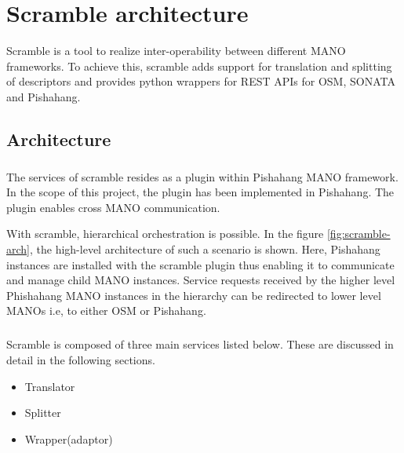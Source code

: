 \chapter{Scramble architecture}
\label{ch:Scramble architecture}

Scramble is a tool to realize inter-operability between different MANO frameworks. To achieve this, scramble adds support for translation and splitting of descriptors and provides python wrappers for REST APIs for OSM, SONATA and Pishahang.
\section{Architecture}
\paragraph{}
The services of scramble resides as a plugin within Pishahang MANO framework. In the scope of this project, the plugin has been implemented in Pishahang. The plugin enables cross MANO communication. 

With scramble, hierarchical orchestration is possible. In the figure \ref{fig:scramble-arch}, the high-level architecture of such a scenario is shown. Here, Pishahang instances are installed with the scramble plugin thus enabling it to communicate and manage child MANO instances. Service requests received by the higher level Phishahang MANO instances in the hierarchy can be redirected to lower level MANOs i.e, to either OSM or Pishahang.

\paragraph{}
Scramble is composed of three main services listed below. These are discussed in detail in the following sections.
\begin{itemize}
	\item Translator
	\item Splitter
	\item Wrapper(adaptor)
\end{itemize}



